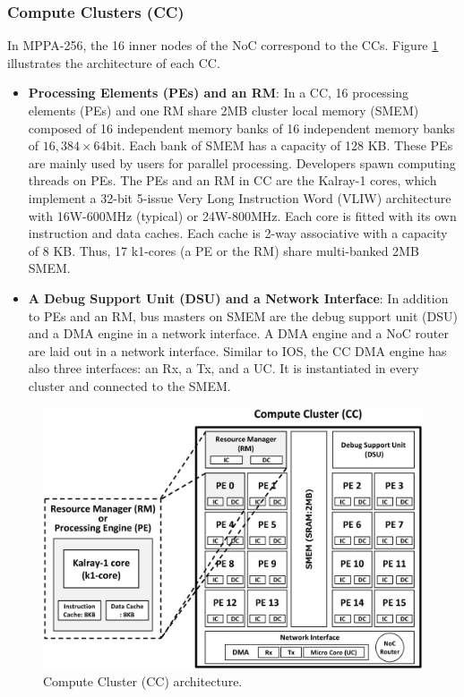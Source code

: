 \documentclass{sig-alternate-05-2015}
\begin{document}
\subsubsection{Compute Clusters (CC)}
\label{sec:cc}
In MPPA-256, the 16 inner nodes of the NoC correspond to the CCs.
Figure \ref{fig:cc_architecture} illustrates the architecture of each CC.

\begin{itemize}
\item \textbf{Processing Elements (PEs) and an RM}:
In a CC, 16 processing elements (PEs) and one RM share 2MB cluster local memory (SMEM) composed of 16 independent memory banks of 16 independent memory banks of $16,384\times 64 $bit.
Each bank of SMEM has a capacity of 128 KB.
These PEs are mainly used by users for parallel processing.
Developers spawn computing threads on PEs.
The PEs and an RM in CC are the Kalray-1 cores, which implement a 32-bit 5-issue Very Long Instruction Word (VLIW) architecture with 16W-600MHz (typical) or 24W-800MHz.
Each core is fitted with its own instruction and data caches.
Each cache is 2-way associative with a capacity of 8 KB.
Thus, 17 k1-cores (a PE or the RM) share multi-banked 2MB SMEM.

\item \textbf{A Debug Support Unit (DSU) and a Network Interface}:
In addition to PEs and an RM, bus masters on SMEM are the debug support unit (DSU) and a DMA engine in a network interface.
A DMA engine and a NoC router are laid out in a network interface.
Similar to IOS, the CC DMA engine has also three interfaces: an Rx, a Tx, and a UC. 
It is instantiated in every cluster and connected to the SMEM.
\end{itemize}

\begin{figure}[t]
  \centering
  \includegraphics[width=1.0\linewidth]{../figure/cc_architecture.eps}
  \caption{\label{fig:cc_architecture}
    Compute Cluster (CC) architecture.}
\end{figure}
\end{document}
